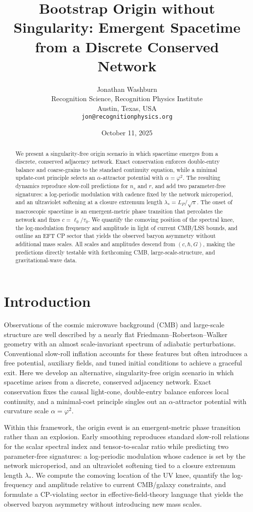 \documentclass[11pt]{article}
\title{\textbf{Bootstrap Origin without Singularity: Emergent Spacetime from a Discrete Conserved Network}}
\author{Jonathan Washburn\\
Recognition Science, Recognition Physics Institute\\
Austin, Texas, USA\\
\texttt{jon@recognitionphysics.org}}
\date{October 11, 2025}
\theoremstyle{definition}
\theoremstyle{remark}
\begin{document}
\maketitle

\begin{abstract}
We present a singularity-free origin scenario in which spacetime emerges from a discrete, conserved adjacency network. Exact conservation enforces double-entry balance and coarse-grains to the standard continuity equation, while a minimal update-cost principle selects an \(\alpha\)-attractor potential with \(\alpha=\varphi^2\). The resulting dynamics reproduce slow-roll predictions for \(n_s\) and \(r\), and add two parameter-free signatures: a log-periodic modulation with cadence fixed by the network microperiod, and an ultraviolet softening at a closure extremum length \(\lambda_{\ast}=L_P/\sqrt{\pi}\). The onset of macroscopic spacetime is an emergent-metric phase transition that percolates the network and fixes \(c=\ell_0/\tau_0\). We quantify the comoving position of the spectral knee, the log-modulation frequency and amplitude in light of current CMB/LSS bounds, and outline an EFT CP sector that yields the observed baryon asymmetry without additional mass scales. All scales and amplitudes descend from \((c,\hbar,G)\), making the predictions directly testable with forthcoming CMB, large-scale-structure, and gravitational-wave data.
\end{abstract}

\section{Introduction}
Observations of the cosmic microwave background (CMB) and large-scale structure are well described by a nearly flat Friedmann–Robertson–Walker geometry with an almost scale-invariant spectrum of adiabatic perturbations. Conventional slow-roll inflation accounts for these features but often introduces a free potential, auxiliary fields, and tuned initial conditions to achieve a graceful exit. Here we develop an alternative, singularity-free origin scenario in which spacetime arises from a discrete, conserved adjacency network. Exact conservation fixes the causal light-cone, double-entry balance enforces local continuity, and a minimal-cost principle singles out an \(\alpha\)-attractor potential with curvature scale \(\alpha=\varphi^2\).

Within this framework, the origin event is an emergent-metric phase transition rather than an explosion. Early smoothing reproduces standard slow-roll relations for the scalar spectral index and tensor-to-scalar ratio while predicting two parameter-free signatures: a log-periodic modulation whose cadence is set by the network microperiod, and an ultraviolet softening tied to a closure extremum length \(\lambda_{\ast}\). We compute the comoving location of the UV knee, quantify the log-frequency and amplitude relative to current CMB/galaxy constraints, and formulate a CP-violating sector in effective-field-theory language that yields the observed baryon asymmetry without introducing new mass scales.
\end{document}
